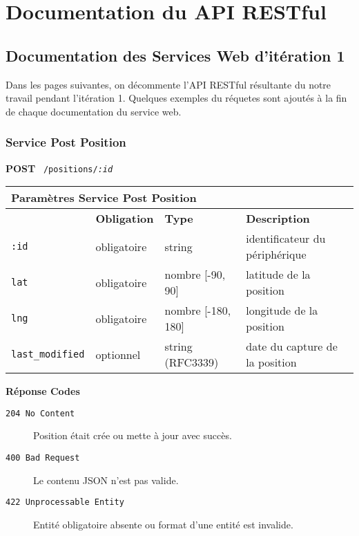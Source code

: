 \chapter{Documentation du API RESTful}

\setlength{\aboverulesep}{0pt}
\setlength{\belowrulesep}{0pt}

\section{Documentation des Services Web d'itération 1}

Dans les pages suivantes, on décommente l'API RESTful résultante du notre
travail pendant l'itération 1. Quelques exemples du réquetes sont ajoutés à la
fin de chaque documentation du service web.

\clearpage
\subsection{Service Post Position}
\label{appendix:sprint1-position-post-doc}

\textbf{POST} \ \texttt{/positions/\textit{:id}}

\begin{table}[htbp]
    \centering
    \begin{tabularx}{\textwidth}{@{}llll@{}}
        \multicolumn{4}{X}{\textbf{Paramètres Service Post Position}} \\
        \toprule
        \rowcolor{gray!20}
        \multicolumn{1}{l}{\textbf{Élément}} &
        \multicolumn{1}{l}{\textbf{Obligation}} &
        \multicolumn{1}{l}{\textbf{Type}} &
        \multicolumn{1}{l}{\textbf{Description}} \\
        \midrule
        \verb|:id| & obligatoire & string & identificateur du périphérique \\
        \verb|lat| & obligatoire & nombre [-90, 90] & latitude de la position \\
        \verb|lng| & obligatoire & nombre [-180, 180] & longitude de la position \\
        \verb|last_modified| & optionnel & string (RFC3339) & date du capture de la position \\
        \bottomrule
    \end{tabularx}
\end{table}

\textbf{Réponse Codes}

\begin{description}
    \item[\texttt{204 No Content}] Position était crée ou mette à jour avec succès.
    \item[\texttt{400 Bad Request}] Le contenu JSON n'est pas valide.
    \item[\texttt{422 Unprocessable Entity}] Entité obligatoire absente ou format d'une entité est invalide.
\end{description}

